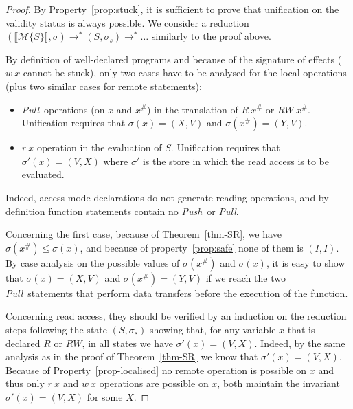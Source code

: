 \documentclass[preprint,12pt]{elsarticle}
\newcommand{\symb}[1]{\textit{#1}}
\newcommand{\Push}{\symb{Push}}
\newcommand{\Pull}{\symb{Pull}}
\newcommand{\isvalid}{\symb{isValid}}
\newcommand{\transl}[1]{\llbracket#1\rrbracket}
\newcommand{\abs}[1]{#1^\#}
\newcommand{\AM}{\mathcal{M}}
\begin{document}
\begin{proof}
 By 
Property~\ref{prop:stuck}, 
it is sufficient to prove that 
unification on the validity status is always possible. 
We consider a reduction  $(\transl{\AM\{S\}},\sigma) \to^* (S,\sigma_s) \to^* \ldots$ 
similarly  to the proof above.

By definition of well-declared 
programs and because of the signature of effects ($w~x$ cannot be stuck), only two 
cases have to be analysed for the local operations (plus two similar cases for remote 
statements):
 \begin{itemize}
\item \Pull\ operations (on $x$ and $\abs x$) in the translation of $R~\abs x$ or 
$RW~\abs x$. Unification 
requires that $\sigma(x)=(X,V)$ and  $\sigma(\abs x)=(Y,V)$.
\item $r~x$ operation in the evaluation of $S$. Unification 
requires that $\sigma'(x)=(V,X)$ where $\sigma'$ is the store in which the read access is 
to be evaluated.
\end{itemize}
Indeed, access mode declarations do not generate reading operations, and by definition 
function statements contain no \Push\ or \Pull.

Concerning the first case, because of Theorem~\ref{thm-SR}, we have $\sigma(\abs x)\leq 
\sigma(x)$, and because of property~\ref{prop:safe} none of them is $(I,I)$. By case 
analysis on the possible values of $\sigma(\abs x)$ and $\sigma(x)$, it is easy to show 
that $\sigma(x)=(X,V)$ and  $\sigma(\abs x)=(Y,V)$ if we reach the two \Pull\ statements 
that perform data transfers before the execution of the function.

Concerning read access, they should be verified by an induction on the reduction steps 
following the state $(S,\sigma_s)$ showing that, for any variable $x$ that is declared $R$ 
or $RW$, in all states we have $\sigma'(x)=(V,X)$. Indeed, by the same analysis as in the 
proof of 
Theorem~\ref{thm-SR} we know that $\sigma'(x)=(V,X)$. Because of 
Property~\ref{prop-localised} no remote operation is possible on $x$ and thus only $r~x$ 
and $w~x$ operations are possible on $x$, both maintain the invariant $\sigma'(x)=(V,X)$ 
for some $X$.
%
\end{proof}
\end{document}
